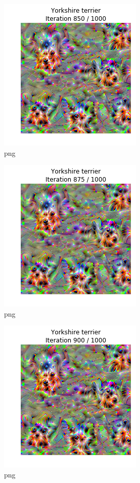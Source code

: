 \documentclass[]{book}
\theoremstyle{definition}
\theoremstyle{definition}
\theoremstyle{definition}
\theoremstyle{remark}
\begin{document}
\begin{figure}
\centering
\includegraphics{Network-Visualization-TensorFlow_files/Network-Visualization-TensorFlow_24_35.png}
\caption{png}
\end{figure}

\begin{figure}
\centering
\includegraphics{Network-Visualization-TensorFlow_files/Network-Visualization-TensorFlow_24_36.png}
\caption{png}
\end{figure}

\begin{figure}
\centering
\includegraphics{Network-Visualization-TensorFlow_files/Network-Visualization-TensorFlow_24_37.png}
\caption{png}
\end{figure}
\end{document}
